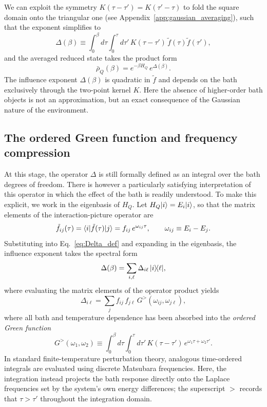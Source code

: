 We can exploit the symmetry $K(\tau-\tau')=K(\tau'-\tau)$ to fold the square domain onto the triangular
one (see Appendix~\ref{app:gaussian_averaging}), such that the exponent simplifies to
\begin{equation}
    \Delta(\beta)
    \equiv\int_0^\beta\!d\tau\int_0^\tau\!d\tau'\,
    K(\tau-\tau')\,\tilde f(\tau)\tilde f(\tau'),
    \label{eq:Delta_def}
\end{equation}
and the averaged reduced state takes the product form
\begin{equation}
    \bar\rho_Q(\beta) = e^{-\beta H_Q}\,e^{\Delta(\beta)}.
    \label{eq:rhobar_product}
\end{equation}
The influence exponent $\Delta(\beta)$ is quadratic in $\tilde f$ and depends on the bath exclusively
through the two-point kernel $K$. Here the absence of higher-order bath objects is not an approximation, but an exact consequence of the Gaussian nature of the environment.

\subsection{The ordered Green function and frequency compression\label{subsec:green_function}}
At this stage, the operator $\Delta$ is still formally defined as an integral over the bath degrees of freedom. There is however a particularly satisfying interpretation of this operator in which the effect of the bath is readily understood. To make this explicit, we work in the eigenbasis of $H_Q$.
Let $H_Q|i\rangle=E_i|i\rangle$, so that the matrix elements of the interaction-picture operator are
\begin{equation}
    \tilde f_{ij}(\tau)
    = \langle i|\tilde f(\tau)|j\rangle
    = f_{ij}\,e^{\omega_{ij}\tau},
    \qquad
    \omega_{ij}\equiv E_i-E_j.
    \label{eq:ftilde_matrix_elements}
\end{equation}
Substituting into Eq.~\eqref{eq:Delta_def} and expanding in the eigenbasis, the influence
exponent takes the spectral form
\begin{equation}
    \Delta(\beta) = \sum_{i,\ell}\Delta_{i\ell}\,|i\rangle\!\langle\ell|,
    \label{eq:Delta_spectral}
\end{equation}
where evaluating the matrix elements of the operator product yields
\begin{equation}
    \Delta_{i\ell}
    = \sum_j f_{ij}\,f_{j\ell}\,G^{>}(\omega_{ij},\omega_{j\ell}),
    \label{eq:Delta_matrix_elements}
\end{equation}
where all bath and temperature dependence has been absorbed into the \emph{ordered Green function}
\begin{equation}
    G^{>}(\omega_1,\omega_2)
    \equiv\int_0^\beta\!d\tau\int_0^\tau\!d\tau'\,
    K(\tau-\tau')\,e^{\omega_1\tau+\omega_2\tau'}.
    \label{eq:Ggt_def}
\end{equation}
In standard finite-temperature perturbation theory, analogous time-ordered integrals are evaluated using discrete Matsubara frequencies. Here, the integration instead projects the bath response directly onto the Laplace frequencies set by the system's own energy differences; the superscript $>$ records that $\tau>\tau'$ throughout the integration domain.

